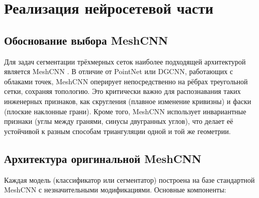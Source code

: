 
\section{Реализация нейросетевой части}

\subsection{Обоснование выбора MeshCNN}
Для задач сегментации трёхмерных сеток наиболее подходящей архитектурой является MeshCNN \cite{meshcnn2019}. В отличие от PointNet или DGCNN, работающих с облаками точек, MeshCNN оперирует непосредственно на рёбрах треугольной сетки, сохраняя топологию. Это критически важно для распознавания таких инженерных признаков, как скругления (плавное изменение кривизны) и фаски (плоские наклонные грани). Кроме того, MeshCNN использует инвариантные признаки (углы между гранями, синусы двугранных углов), что делает её устойчивой к разным способам триангуляции одной и той же геометрии.

\subsection{Архитектура оригинальной MeshCNN}
Каждая модель (классификатор или сегментатор) построена на базе стандартной MeshCNN с незначительными модификациями. Основные компоненты:

